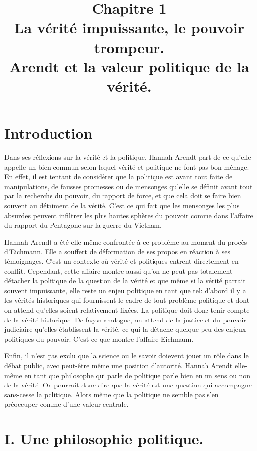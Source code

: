 \documentclass[12pt]{article}
\title{Chapitre 1\\\large La vérité impuissante, le pouvoir trompeur.\\Arendt et la valeur politique de la vérité.}
\date{}
\author{}
\begin{document}
\maketitle
\thispagestyle{fancy}
\tableofcontents
{}
\pagebreak
\section*{\color{red}Introduction}
Dans ses réflexions sur la vérité et la politique, Hannah Arendt part de ce qu'elle appelle un bien commun selon lequel vérité et politique ne font pas bon ménage.
En effet, il est tentant de considérer que la politique est avant tout faite de manipulations, de fausses promesses ou de mensonges qu'elle se définit avant tout par la recherche du pouvoir, du rapport de force, et que cela doit se faire bien souvent au détriment de la vérité.
C'est ce qui fait que les mensonges les plus absurdes peuvent infiltrer les plus hautes sphères du pouvoir comme dans l'affaire du rapport du Pentagone sur la guerre du Vietnam.\par
Hannah Arendt a été elle-même confrontée à ce problème au moment du procès d'Eichmann. Elle a souffert de déformation de ses propos en réaction à ses témoignages.
C'est un contexte où vérité et politiques entrent directement en conflit.
Cependant, cette affaire montre aussi qu'on ne peut pas totalement détacher la politique de la question de la vérité et que même si la vérité parrait souvent impuissante, elle reste un enjeu politique en tant que tel: d'abord il y a les vérités historiques qui fournissent le cadre de tout problème politique et dont on attend qu'elles soient relativement fixées.
La politique doit donc tenir compte de la vérité historique.
De façon analogue, on attend de la justice et du pouvoir judiciaire qu'elles établissent la vérité, ce qui la détache quelque peu des enjeux politiques du pouvoir.
C'est ce que montre l'affaire Eichmann.\par
Enfin, il n'est pas exclu que la science ou le savoir doievent jouer un rôle dans le débat public, avec peut-être même une position d'autorité.
Hannah Arendt elle-même en tant que philosophe qui parle de politique parle bien en un sens ou non de la vérité.
On pourrait donc dire que la vérité est une question qui accompagne sans-cesse la politique.
Alors même que la politique ne semble pas s'en préoccuper comme d'une valeur centrale.
\pagebreak
\section*{\color{red}I. Une philosophie politique.}
\end{document}
